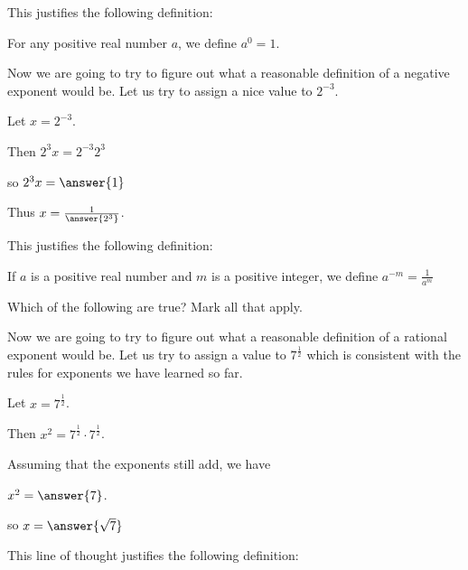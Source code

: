 \documentclass{ximera}
\begin{document}
This justifies the following definition:

\begin{definition}
For any positive real number $a$, we define $a^0 = 1$.
\end{definition}

\begin{question}
	Now we are going to try to figure out what a reasonable definition of a negative exponent would be.   Let us try to assign a nice value to $2^{-3}$. 
	
	Let $x = 2^{-3}$.

	Then $2^3 x = 2^{-3} 2^3$
	
	so $2^3 x = \answer{1}$
	
	Thus $x = \frac{1}{\answer{2^3}}$.
\end{question}

This justifies the following definition:

\begin{definition}
	If $a$ is a positive real number and $m$ is a positive integer, we define $a^{-m} = \frac{1}{a^m}$
\end{definition}

\begin{question}
	Which of the following are true?  Mark all that apply.
	\begin{selectAll}
	\end{selectAll}
\end{question}

\begin{question}
Now we are going to try to figure out what a reasonable definition of a rational exponent would be.  Let us try to assign a value to $7^\frac{1}{2}$ which is consistent with the rules for exponents we have learned so far.

Let $x = 7^\frac{1}{2}$.

Then $x^2 = 7^\frac{1}{2} \cdot 7^\frac{1}{2}$.

Assuming that the exponents still add, we have

$x^2 =  \answer{7}$.

so $x = \answer{\sqrt{7}}$
\end{question}


This line of thought justifies the following definition:
\end{document}
